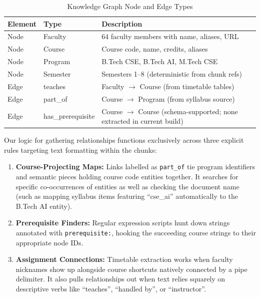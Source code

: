 \documentclass[12pt,a4paper]{report}
\begin{document}
\begin{table}[htbp]
  \centering
    \vspace*{5pt}
  \begin{tabular}{|l|l|p{6cm}|}
    \hline
    \textbf{Element} & \textbf{Type} & \textbf{Description} \\ \hline
    Node & Faculty   & 64 faculty members with name, aliases, URL     \\ \hline
    Node & Course    & Course code, name, credits, aliases             \\ \hline
    Node & Program   & B.Tech CSE, B.Tech AI, M.Tech CSE               \\ \hline
    Node & Semester  & Semesters 1--8 (deterministic from chunk refs)   \\ \hline
    Edge & teaches          & Faculty $\rightarrow$ Course (from timetable tables) \\ \hline
    Edge & part\_of          & Course $\rightarrow$ Program (from syllabus source)   \\ \hline
    Edge & has\_prerequisite & Course $\rightarrow$ Course (schema-supported; none extracted in current build)   \\ \hline
  \end{tabular}
  \caption{Knowledge Graph Node and Edge Types}
  \label{tab:kg_types}

\end{table}

Our logic for gathering relationships functions exclusively across three explicit rules targeting text formatting within the chunks:
\begin{enumerate}
  \item \textbf{Course-Projecting Maps:} Links labelled as \texttt{part\_of} tie program identifiers and semantic pieces holding course code entities together. It searches for specific co-occurrences of entities as well as checking the document name (such as mapping syllabus items featuring ``cse\_ai'' automatically to the B.Tech AI entity).
  \item \textbf{Prerequisite Finders:} Regular expression scripts hunt down strings annotated with \texttt{prerequisite:}, hooking the succeeding course strings to their appropriate node IDs.
  \item \textbf{Assignment Connections:} Timetable extraction works when faculty nicknames show up alongside course shortcuts natively connected by a pipe delimiter. It also pulls relationships out when text relies squarely on descriptive verbs like ``teaches'', ``handled by'', or ``instructor''.
\end{enumerate}
\end{document}
